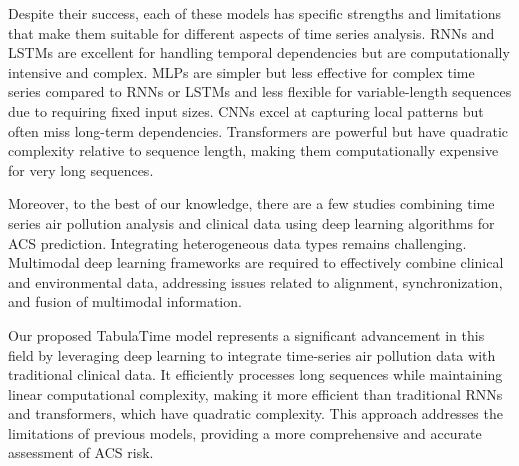 Despite their success, each of these models has specific strengths and limitations that make them suitable for different aspects of time series analysis. RNNs and LSTMs are excellent for handling temporal dependencies but are computationally intensive and complex. MLPs are simpler but less effective for complex time series compared to RNNs or LSTMs and less flexible for variable-length sequences due to requiring fixed input sizes. CNNs excel at capturing local patterns but often miss long-term dependencies. Transformers are powerful but have quadratic complexity relative to sequence length, making them computationally expensive for very long sequences.

Moreover, to the best of our knowledge, there are a few studies \cite{Sayed2024Novel} combining time series air pollution analysis and clinical data using deep learning algorithms for ACS prediction. Integrating heterogeneous data types remains challenging.  Multimodal deep learning frameworks are required to effectively combine clinical and environmental data, addressing issues related to alignment, synchronization, and fusion of multimodal information.  

Our proposed TabulaTime model represents a significant advancement in this field by leveraging deep learning to integrate time-series air pollution data with traditional clinical data. It efficiently processes long sequences while maintaining linear computational complexity, making it more efficient than traditional RNNs and transformers, which have quadratic complexity. This approach addresses the limitations of previous models, providing a more comprehensive and accurate assessment of ACS risk.